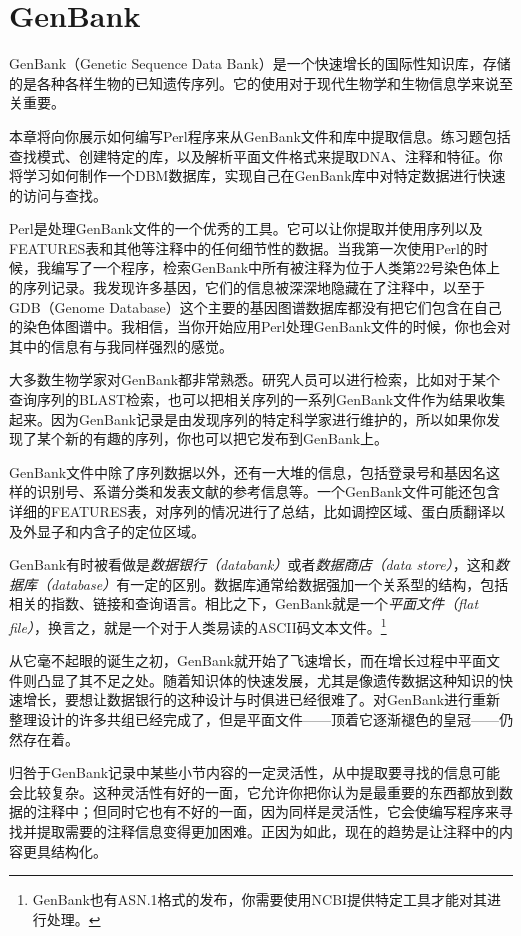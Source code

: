 \chapter{GenBank}
\label{chap:chapter10}
\minitoc

GenBank（Genetic Sequence Data Bank）是一个快速增长的国际性知识库，存储的是各种各样生物的已知遗传序列。它的使用对于现代生物学和生物信息学来说至关重要。

本章将向你展示如何编写Perl程序来从GenBank文件和库中提取信息。练习题包括查找模式、创建特定的库，以及解析平面文件格式来提取DNA、注释和特征。你将学习如何制作一个DBM数据库，实现自己在GenBank库中对特定数据进行快速的访问与查找。

Perl是处理GenBank文件的一个优秀的工具。它可以让你提取并使用序列以及FEATURES表和其他等注释中的任何细节性的数据。当我第一次使用Perl的时候，我编写了一个程序，检索GenBank中所有被注释为位于人类第22号染色体上的序列记录。我发现许多基因，它们的信息被深深地隐藏在了注释中，以至于GDB（Genome
Database）这个主要的基因图谱数据库都没有把它们包含在自己的染色体图谱中。我相信，当你开始应用Perl处理GenBank文件的时候，你也会对其中的信息有与我同样强烈的感觉。

大多数生物学家对GenBank都非常熟悉。研究人员可以进行检索，比如对于某个查询序列的BLAST检索，也可以把相关序列的一系列GenBank文件作为结果收集起来。因为GenBank记录是由发现序列的特定科学家进行维护的，所以如果你发现了某个新的有趣的序列，你也可以把它发布到GenBank上。

GenBank文件中除了序列数据以外，还有一大堆的信息，包括登录号和基因名这样的识别号、系谱分类和发表文献的参考信息等。一个GenBank文件可能还包含详细的FEATURES表，对序列的情况进行了总结，比如调控区域、蛋白质翻译以及外显子和内含子的定位区域。

GenBank有时被看做是\textit{数据银行（databank）}或者\textit{数据商店（data store）}，这和\textit{数据库（database）}有一定的区别。数据库通常给数据强加一个关系型的结构，包括相关的指数、链接和查询语言。相比之下，GenBank就是一个\textit{平面文件（flat file）}，换言之，就是一个对于人类易读的ASCII码文本文件。\footnote{GenBank也有ASN.1格式的发布，你需要使用NCBI提供特定工具才能对其进行处理。} 

从它毫不起眼的诞生之初，GenBank就开始了飞速增长，而在增长过程中平面文件则凸显了其不足之处。随着知识体的快速发展，尤其是像遗传数据这种知识的快速增长，要想让数据银行的这种设计与时俱进已经很难了。对GenBank进行重新整理设计的许多共组已经完成了，但是平面文件——顶着它逐渐褪色的皇冠——仍然存在着。

归咎于GenBank记录中某些小节内容的一定灵活性，从中提取要寻找的信息可能会比较复杂。这种灵活性有好的一面，它允许你把你认为是最重要的东西都放到数据的注释中；但同时它也有不好的一面，因为同样是灵活性，它会使编写程序来寻找并提取需要的注释信息变得更加困难。正因为如此，现在的趋势是让注释中的内容更具结构化。


